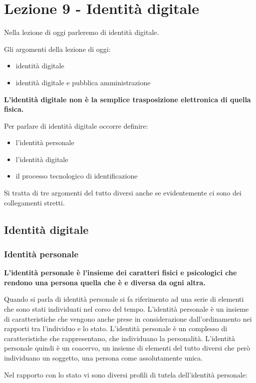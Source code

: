 \chapter{Lezione 9 - Identità digitale}

Nella lezione di oggi parleremo di identità digitale. 

Gli argomenti della lezione di oggi:
\begin{itemize}
    \item identità digitale 
    \item identità digitale e pubblica amministrazione 
\end{itemize}

\textbf{L'identità digitale non è la semplice trasposizione elettronica di quella fisica.} 

Per parlare di identità digitale occorre definire:
\begin{itemize}
    \item l'identità personale 
    \item l'identità digitale
    \item il processo tecnologico di identificazione
\end{itemize}

Si tratta di tre argomenti del tutto diversi anche se evidentemente ci sono dei collegamenti stretti.

\section{Identità digitale}
\subsection{Identità personale}

\textbf{L'identità personale è l'insieme dei caratteri fisici e psicologici che rendono una persona quella che è e diversa da ogni altra.} 

Quando si parla di identità personale si fa riferimento ad una serie di elementi che sono stati individuati nel corso del tempo. L'identità personale è un insieme di caratteristiche che vengono anche prese in considerazione dall'ordinamento nei rapporti tra l'individuo e lo stato.
L'identità personale è un complesso di caratteristiche che rappresentano, che individuano la personalità. L'identità personale quindi è un coacervo, un insieme di elementi del tutto diversi che però individuano un soggetto, una persona come assolutamente unica.

Nel rapporto con lo stato vi sono diversi profili di tutela dell'identità personale:

